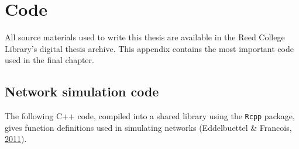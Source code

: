 \documentclass[12pt,twoside]{reedthesis}
\theoremstyle{definition}
\theoremstyle{definition}
\theoremstyle{remark}
\begin{document}
\appendix


\chapter{Code}\label{code}

All source materials used to write this thesis are available in the Reed
College Library's digital thesis archive. This appendix contains the
most important code used in the final chapter.

\section{Network simulation code}\label{network-simulation-code}
\begin{Shaded}
\begin{Highlighting}[]
  \NormalTok{(}\NormalTok{, } \NormalTok{)}
  \NormalTok{(}\NormalTok{)}

\end{Highlighting}
\end{Shaded}
The following C++ code, compiled into a shared library using the
\texttt{Rcpp} package, gives function definitions used in simulating
networks (Eddelbuettel \& Francois,
\protect\hyperlink{ref-Eddelbuettel2011}{2011}).
\end{document}
